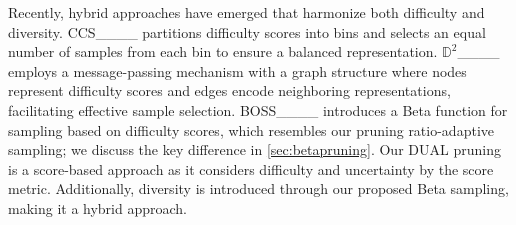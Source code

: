 Recently, hybrid approaches have emerged that harmonize both difficulty and diversity. CCS____ partitions difficulty scores into bins and selects an equal number of samples from each bin to ensure a balanced representation.
$\mathbb{D}^2$____ employs a message-passing mechanism with a graph structure where nodes represent difficulty scores and edges encode neighboring representations, facilitating effective sample selection. BOSS____ introduces a Beta function for sampling based on difficulty scores, which resembles our pruning ratio-adaptive sampling; we discuss the key difference in \cref{sec:betapruning}. 
Our DUAL pruning is a score-based approach as it considers difficulty and uncertainty by the score metric. Additionally, diversity is introduced through our proposed Beta sampling, making it a hybrid approach.